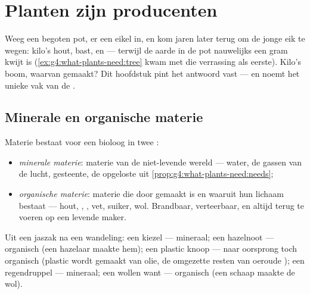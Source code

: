 \chapter{Planten zijn producenten}\label{ch:g6:plants-are-producers}

Weeg een begoten pot,  er een eikel in, en kom jaren later terug om
de jonge eik te wegen: kilo's hout, bast,  en  --- terwijl de
aarde in de pot nauwelijks een gram kwijt is
(\cref{ex:g4:what-plants-need:tree} kwam met die verrassing als eerste).
Kilo's boom, waarvan gemaakt? Dit hoofdstuk pint het antwoord vast ---
en noemt het unieke vak van de .

\section{Minerale en organische materie}

\begin{definition}\label{def:g6:plants-are-producers:matter}
Materie bestaat voor een bioloog in twee :
\begin{itemize}
  \item \emph{minerale materie}: materie van de
        niet-levende wereld --- water, de gassen van de lucht, gesteente,
        de opgeloste  uit
        \cref{prop:g4:what-plants-need:needs};
  \item \emph{organische materie}: materie die
        door  gemaakt is en waaruit hun lichaam bestaat ---
        hout, , , vet, suiker, wol. Brandbaar, verteerbaar, en
        altijd terug te voeren op een levende maker.
\end{itemize}
\end{definition}

\begin{example}\label{ex:g6:plants-are-producers:sorting}
Uit een jaszak na een wandeling: een kiezel --- mineraal; een hazelnoot
--- organisch (een hazelaar maakte hem); een plastic knoop --- naar
oorsprong toch organisch (plastic wordt gemaakt van olie, de omgezette
resten van oeroude ); een regendruppel --- mineraal; een
wollen want --- organisch (een schaap maakte de wol).
\end{example}

